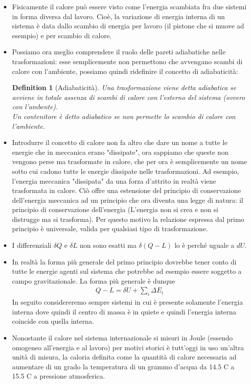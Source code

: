 \documentclass[10pt,a4paper]{article}
\newtheorem{definition}{Definition}
\begin{document}
\begin{itemize}
\item Fisicamente il calore può essere visto come l'energia scambiata fra due sistemi in forma diversa dal lavoro. Cioè, la variazione di energia interna di un sistema è data dallo scambio di energia per lavoro (il pistone che si muove ad esempio)  e per scambio di calore.
\item Possiamo ora meglio comprendere il ruolo delle pareti adiabatiche nelle trasformazioni: esse semplicemente non permettono che avvengano scambi di calore con l'ambiente, possiamo quindi ridefinire il concetto di adiabaticità:
\begin{definition}[Adiabaticità]
	Una trasformazione viene detta adiabatica se avviene in totale assenza di scambi di calore con l'esterno del sistema (ovvero con l'ambente).\\
	Un contenitore è detto adiabatico se non permette lo scambio di calore con l'ambiente.
\end{definition}
\item Introdurre il concetto di calore non fa altro che dare un nome a tutte le energie che in meccanica erano "dissipate", ora sappiamo che queste non vengono perse ma trasformate in calore, che per ora è semplicemente un nome sotto cui cadono tutte le energie dissipate nelle trasformazioni. Ad esempio, l'energia meccanica "dissipata" da una forza d'attrito in realtà viene trasformata in calore. Ciò offre una estensione del principio di conservazione dell'energia meccanica ad un principio che ora diventa una legge di natura: il principio di conservazione dell'energia (L'energia non si crea e non si distrugge ma si trasforma). Per questo motivo la relazione espressa dal primo principio è universale, valida per qualsiasi tipo di trasformazione. 
\item I differenziali $\delta Q$ e $\delta L$ non sono esatti ma $\delta(Q-L)$ lo è perché uguale a $dU$.
\item In realtà la forma più generale del primo principio dovrebbe tener conto di tutte le energie agenti sul sistema che potrebbe ad esempio essere soggetto a campo gravitazionale. La forma più generale è dunque
\begin{align*} 
	Q-L = \delta U + \sum_i \Delta E_i
\end{align*} 
In seguito considereremo sempre sistemi in cui è presente solamente l'energia interna dove quindi il centro di massa è in quiete e quindi l'energia interna coincide con quella interna. 
\item Nonostante il calore nel sistema internazionale si misuri in Joule (essendo omogeneo all'energia e al lavoro) per motivi storici è tutt'oggi in uso un'altra unità di misura, la caloria definita come la quantità di calore necessaria ad aumentare di un grado la temperatura di un grammo d'acqua da 14.5 C a 15.5 C a pressione atmosferica. 

\end{itemize}
\end{document}
